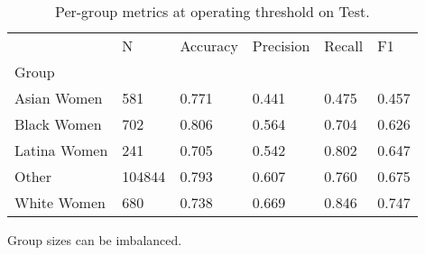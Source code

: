 \begin{table}[htbp]
\centering
\caption{Per-group metrics at operating threshold on Test.}
\label{tab:08-group-metrics}
\begin{tabular}{llllll}
\toprule
 & N & Accuracy & Precision & Recall & F1 \\
Group &  &  &  &  &  \\
\midrule
Asian Women & 581 & 0.771 & 0.441 & 0.475 & 0.457 \\
Black Women & 702 & 0.806 & 0.564 & 0.704 & 0.626 \\
Latina Women & 241 & 0.705 & 0.542 & 0.802 & 0.647 \\
Other & 104844 & 0.793 & 0.607 & 0.760 & 0.675 \\
White Women & 680 & 0.738 & 0.669 & 0.846 & 0.747 \\
\bottomrule
\end{tabular}

\begin{tablenotes}[flushleft]
\item \small{Group sizes can be imbalanced.}
\end{tablenotes}
\end{table}